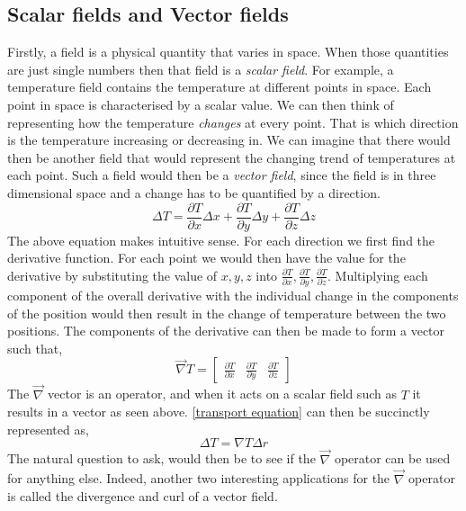 \subsection{Scalar fields and Vector fields} 
Firstly, a field is a physical quantity that varies in space. When those quantities are just single numbers then that field is a \emph{scalar field}. For example, a temperature field contains the temperature at different points in space. Each point in space is characterised by a scalar value. We can then think of representing how the temperature \emph{changes} at every point. That is which direction is the temperature increasing or decreasing in. We can imagine that there would then be another field that would represent the changing trend of temperatures at each point. Such a field would then be a \emph{vector field}, since the field is in three dimensional space and a change has to be quantified by a direction.
\begin{equation}
	\label{transport equation}
	\Delta T = \frac{\partial T}{\partial x}\Delta x +  \frac{\partial T}{\partial y}\Delta y + \frac{\partial T}{\partial z}\Delta z
\end{equation}
The above equation makes intuitive sense. For each direction we first find the derivative function. For each point we would then have the value for the derivative by substituting the value of $x,y, z$ into $\frac{\partial T}{\partial x}, \frac{\partial T}{\partial y}, \frac{\partial T}{\partial z}$. Multiplying each component of the overall derivative with the individual change in the components of the position would then result in the change of temperature between the two positions. The components of the derivative can then be made to form a vector such that, 
\begin{equation}
	  \vec{\nabla}T = 
	  \begin{bmatrix} 
	  	\frac{\partial T}{\partial x} & \frac{\partial T}{\partial y} & \frac{\partial T}{\partial z}
	  \end{bmatrix}
\end{equation}
The $\vec{\nabla}$ vector is an operator, and when it acts on a scalar field such as $T$ it results in a vector as seen above. \autoref{transport equation} can then be succinctly represented as, 
\begin{equation}
	\Delta T = \nabla T \Delta r
\end{equation}
The natural question to ask, would then be to see if the $\vec{\nabla}$ operator can be used for anything else. Indeed, another two interesting applications for the $\vec{\nabla}$ operator is called the divergence and curl of a vector field.\\
